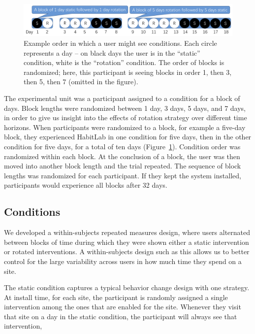 
\begin{figure}[tb]
\centering
	\includegraphics[width=1.0\textwidth]{figures/experiment1_design_figure_v2.png}
	\caption{Example order in which a user might see conditions. Each circle represents a day -- on black days the user is in the ``static'' condition, white is the ``rotation'' condition. The order of blocks is randomized; here, this participant is seeing blocks in order 1, then 3, then 5, then 7 (omitted in the figure).}
\label{fig:experiment1_design_figure}
\end{figure}

The experimental unit was a participant assigned to a condition for a block of days. Block lengths were randomized between 1 day, 3 days, 5 days, and 7 days, in order to give us insight into the effects of rotation strategy over different time horizons. When participants were randomized to a block, for example a five-day block, they experienced HabitLab in one condition for five days, then in the other condition for five days, for a total of ten days (Figure~\ref{fig:experiment1_design_figure}). Condition order was randomized within each block. At the conclusion of a block, the user was then moved into another block length and the trial repeated. The sequence of block lengths was randomized for each participant. If they kept the system installed, participants would experience all blocks after 32 days.

\subsection{Conditions}
We developed a within-subjects repeated measures design, where users alternated between blocks of time during which they were shown either a static intervention or rotated interventions. A within-subjects design such as this allows us to better control for the large variability across users in how much time they spend on a site.

The static condition captures a typical behavior change design with one strategy. At install time, for each site, the participant is randomly assigned a single intervention among the ones that are enabled for the site. Whenever they visit that site on a day in the static condition, the participant will always see that intervention, 

